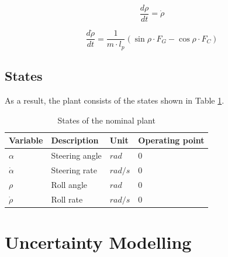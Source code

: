 \documentclass[conference]{IEEEtran}
\begin{document}
\begin{equation}
\frac{{d\rho }}{{dt}} = \dot \rho
\end{equation}

\begin{equation}
\frac{{d\dot \rho }}{{dt}} = \frac{1}{{m \cdot {l_p}}}\left( {\sin \rho  \cdot {F_G} - \cos \rho  \cdot {F_C}} \right)
\end{equation}


\subsection{States}

As a result, the plant consists of the states shown in Table \ref{figure:states}.

\begin{table}[h]
\begin{center}
\begin{tabular}{|l||l|l|l|}
\hline
Variable 		& Description 		& Unit		& Operating point \\
\hline
$\alpha$ 		& Steering angle 	& $rad$	& 0\\
\hline
$\dot \alpha$	& Steering rate 	& $rad/s$	& 0\\
\hline
$\rho$			& Roll angle 		& $rad$	& 0\\
\hline
$\dot \rho$		& Roll rate 		& $rad/s$	& 0\\
\hline
\end{tabular}
\caption{States of the nominal plant}  
\label{figure:states}
\end{center}
\end{table}


\section{Uncertainty Modelling}


%
\end{document}
